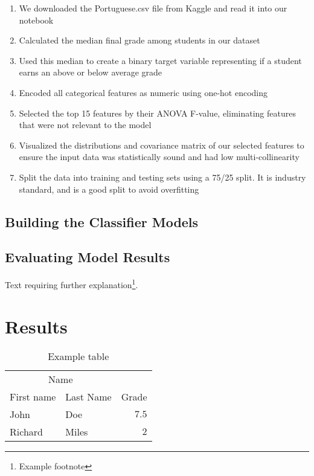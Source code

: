 \documentclass[twoside,twocolumn]{article}
\begin{document}
\begin{enumerate}
	\item We downloaded the Portuguese.csv file from Kaggle and read it into our notebook
	\item Calculated the median final grade among students in our dataset
	\item Used this median to create a binary target variable representing if a student earns an above or below average grade
	\item Encoded all categorical features as numeric using one-hot encoding 
	\item Selected the top 15 features by their ANOVA F-value, eliminating features that were not relevant to the model
	\item Visualized the distributions and covariance matrix of our selected features to ensure the input data was statistically sound and had low multi-collinearity
	\item Split the data into training and testing sets using a 75/25 split. It is industry standard, and is a good split to avoid overfitting
\end{enumerate}
\subsection{Building the Classifier Models}
\subsection{Evaluating Model Results}

Text requiring further explanation\footnote{Example footnote}.


\section{Results}

\begin{table}
\caption{Example table}
\centering
\begin{tabular}{llr}
\toprule
\multicolumn{2}{c}{Name} \\
\cmidrule(r){1-2}
First name & Last Name & Grade \\
\midrule
John & Doe & $7.5$ \\
Richard & Miles & $2$ \\
\bottomrule
\end{tabular}
\end{table}
\end{document}
